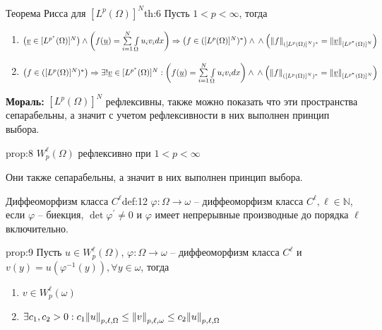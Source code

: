 \documentclass[12pt,a4paper]{article}
\newcommand{\intset}[1]{\int\limits_{#1}}
\newcommand{\Natural}{\mathbb{N}}
\begin{document}
\begin{theorem}{Теорема Рисса для $[L^p (\Omega)]^N$}{th:6}
	Пусть $1 < p < \infty$, тогда
	\begin{enumerate}
		\item $\left(\underline{v} \in [L^{p^*} (\Omega)]^N\right) \wedge \left(f(\underline{u}) = \sum\limits_{i=1}^N{\intset{\Omega}{u_i v_i dx}}\right) \Rightarrow \left(f \in ([L^p (\Omega)]^N)^*\right) \wedge \\ \wedge \left(\norm{f}_{([L^p (\Omega)]^N)^*} = \norm{\underline{v}}_{[L^{p^*} (\Omega)]^N}\right)$
		\item $\left(f \in ([L^p (\Omega)]^N)^*\right) \Rightarrow \exists! \underline{v} \in  [L^{p^*} (\Omega)]^N: \left(f(\underline{u}) = \sum\limits_{i=1}^N{\intset{\Omega}{u_i v_i dx}}\right) \wedge \\ \wedge \left(\norm{f}_{([L^p (\Omega)]^N)^*} = \norm{\underline{v}}_{[L^{p^*} (\Omega)]^N}\right)$
	\end{enumerate}
\end{theorem}
\textbf{Мораль:} $[L^p (\Omega)]^N$ рефлексивны, также можно показать что эти пространства сепарабельны, а значит с учетом рефлексивности в них выполнен принцип выбора.

\begin{proposition}{}{prop:8}
	$W_p^\ell (\Omega)$ рефлексивно при $1 < p < \infty$
\end{proposition}
Они также сепарабельны, а значит в них выполнен принцип выбора.

\begin{definition}{Диффеоморфизм класса $C^\ell$}{def:12}
	$\varphi: \Omega \to \omega$ -- диффеоморфизм класса $C^\ell, \ell \in \Natural$, если $\varphi$ -- биекция, $\det \varphi^\prime \neq 0$ и $\varphi$ имеет непрерывные производные до порядка $\ell$ включительно.
\end{definition}

\begin{proposition}{}{prop:9}
	Пусть $u \in W_p^\ell (\Omega)$, $\varphi: \Omega \to \omega$ -- диффеоморфизм класса $C^\ell$ и \\ $v(y) = u(\varphi^{-1} (y)), \forall y \in \omega$, тогда
	\begin{enumerate}
		\item $v \in W_p^\ell (\omega)$
		\item $\exists c_1, c_2 > 0: c_1 \norm{u}_{p, \ell, \Omega} \leq \norm{v}_{p, \ell, \omega} \leq c_2 \norm{u}_{p, \ell, \Omega}$
	\end{enumerate}
\end{proposition}
\end{document}
